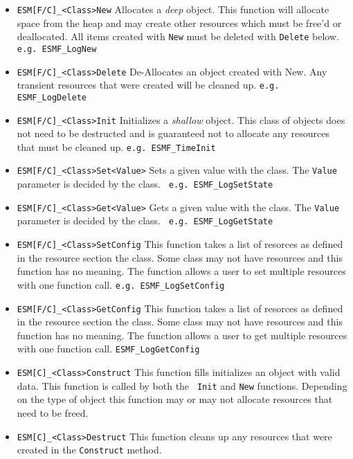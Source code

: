 \begin{itemize}
\item{\tt ESM[F/C]\_<Class>New} Allocates a {\it deep} object.  This
  function will allocate space from the heap and may create other
  resources which must be free'd or deallocated.  All items created
  with {\tt New} must be deleted with {\tt Delete} below.  {\tt e.g.
    ESMF\_LogNew}
  
\item{\tt ESM[F/C]\_<Class>Delete} De-Allocates an object created with
  New.  Any transient resources that were created will be cleaned up.
  {\tt e.g. ESMF\_LogDelete}
  
\item{\tt ESM[F/C]\_<Class>Init} Initializes a {\it shallow} object.
  This class of objects does not need to be destructed and is
  guaranteed not to allocate any resources that must be cleaned up.
  {\tt e.g. ESMF\_TimeInit}
  
\item{\tt ESM[F/C]\_<Class>Set<Value>} Sets a given value with the
  class.  The {\tt Value} parameter is decided by the class.  {\tt
    e.g. ESMF\_LogSetState}
  
\item{\tt ESM[F/C]\_<Class>Get<Value>} Gets a given value with the
  class.  The {\tt Value} parameter is decided by the class.  {\tt
    e.g. ESMF\_LogGetState}
  
\item{\tt ESM[F/C]\_<Class>SetConfig} This function takes a list of
  resorces as defined in the resource section the class.  Some class
  may not have resources and this function has no meaning.  The
  function allows a user to set multiple resources with one function
  call.  {\tt e.g. ESMF\_LogSetConfig}
  
\item{\tt ESM[F/C]\_<Class>GetConfig} This function takes a list of
  resorces as defined in the resource section the class.  Some class
  may not have resources and this function has no meaning.  The
  function allows a user to get multiple resources with one function
  call.  {\tt ESMF\_LogGetConfig}
  
\item{\tt ESM[C]\_<Class>Construct} This function fills initializes an
  object with valid data.  This function is called by both the {\tt
    Init} and {\tt New} functions.  Depending on the type of object
  this function may or may not allocate resources that need to be
  freed.
  
\item{\tt ESM[C]\_<Class>Destruct} This function cleans up any
  resources that were created in the {\tt Construct} method.

\end{itemize}

